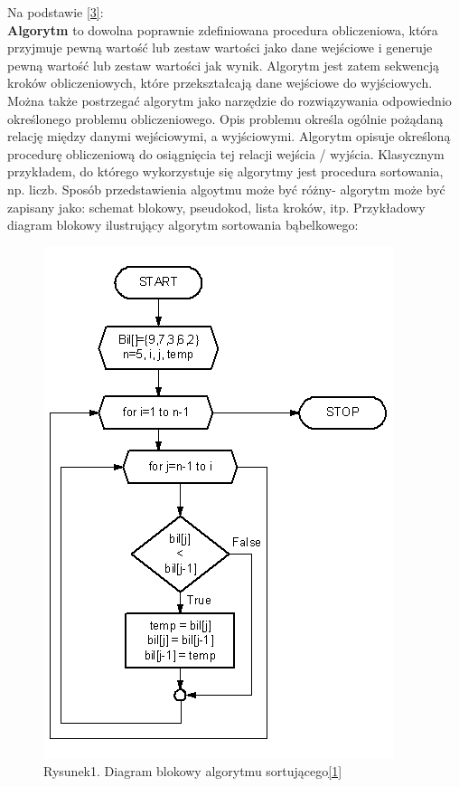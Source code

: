\documentclass[a4paper, twoside, 12pt, justified]{article}
\begin{document}
	Na podstawie \hyperlink{algorithm}{[3]}:\\
	\textbf{Algorytm} to dowolna poprawnie zdefiniowana procedura obliczeniowa, która przyjmuje pewną wartość lub zestaw wartości jako dane wejściowe i generuje pewną wartość lub zestaw wartości jak wynik. Algorytm jest zatem sekwencją kroków obliczeniowych, które przekształcają dane wejściowe do wyjściowych.\\
	Można także postrzegać algorytm jako narzędzie do rozwiązywania odpowiednio określonego problemu obliczeniowego. Opis problemu określa ogólnie pożądaną
	relację między danymi wejściowymi, a wyjściowymi. Algorytm opisuje określoną procedurę obliczeniową do osiągnięcia tej relacji wejścia / wyjścia. Klasycznym przykładem, do którego wykorzystuje się algorytmy jest procedura sortowania, np. liczb. Sposób przedstawienia algoytmu może być różny- algorytm może być zapisany jako: schemat blokowy, pseudokod, lista kroków, itp. Przykładowy diagram blokowy ilustrujący algorytm sortowania bąbelkowego:
	\begin{figure}[h]
		\includegraphics[scale=0.735]{bubble_sort}
		\centering
		\\
		{Rysunek1. Diagram blokowy algorytmu sortującego\hyperlink{bubble}{[1]}} 
	\end{figure}
	
\end{document}
